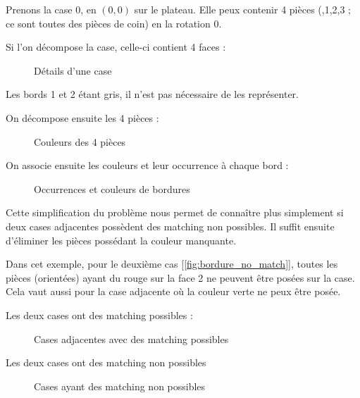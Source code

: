 	\begin{exmp}
		Prenons la case 0, en $(0,0)$ sur le plateau. Elle peux contenir 4 pièces (,1,2,3 ; ce sont toutes des pièces de coin) en la rotation 0.
		
		Si l'on décompose la case, celle-ci contient 4 faces :
		
		\begin{figure}[H]
			

			\caption{Détails d'une case}\label{fig:case}
		\end{figure}
		
		Les bords 1 et 2 étant gris, il n'est pas nécessaire de les représenter. 
		\endminipage\hfill
	
		On décompose ensuite les 4 pièces :
		
		\begin{figure}[H]
			
			\caption{Couleurs des 4 pièces}\label{fig:4_pieces}
		\end{figure}
		\endminipage\hfill
			On associe ensuite les couleurs et leur occurrence à chaque bord :
			\begin{figure}[H]
				
				
				\caption{Occurrences et couleurs de bordures}\label{fig:4_pieces_on_bordure}
			\end{figure}
		\endminipage\hfill
	\end{exmp}
	
	Cette simplification du problème nous permet de connaître plus simplement si deux cases adjacentes possèdent des matching non possibles. Il suffit ensuite d'éliminer les pièces possédant la couleur manquante.
		
	\begin{exmp} Dans cet exemple, pour le deuxième cas [\autoref{fig:bordure_no_match}], toutes les pièces (orientées) ayant du rouge sur la face 2 ne peuvent être posées sur la case. Cela vaut aussi pour la case adjacente où la couleur verte ne peux être posée.
			
		\minipage[t]{0.45\textwidth}
			Les deux cases ont des matching possibles :
			
			\begin{figure}[H]
				
				\caption{Cases adjacentes avec des matching possibles}\label{fig:bordure_match}
			\end{figure}
		
		\endminipage\hfill
		\minipage[t]{0.45\textwidth}
			Les deux cases ont des matching non possibles
			
			\begin{figure}[H]
				
				\caption{Cases ayant des matching non possibles}\label{fig:bordure_no_match}
			\end{figure}
			\endminipage\hfill
	\end{exmp}
	
